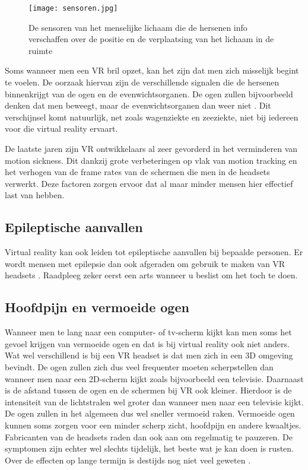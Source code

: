 \begin{figure}[h]
    \centering
    \texttt{[image: sensoren.jpg]}
    \caption{De sensoren van het menselijke lichaam die de hersenen info verschaffen over de positie en de verplaatsing van het lichaam in de ruimte \autocite{Dizzy2018}}
\end{figure}

Soms wanneer men een VR bril opzet, kan het zijn dat men zich misselijk begint te voelen. De oorzaak hiervan zijn de verschillende signalen die de hersenen binnenkrijgt van de ogen en de evenwichtsorganen.
De ogen zullen bijvoorbeeld denken dat men beweegt, maar de evenwichtsorganen dan weer niet \autocite{Kraft2017}. Dit verschijnsel komt natuurlijk, net zoals wagenziekte en zeeziekte, niet bij iedereen voor die virtual reality ervaart.

\pagebreak
De laatste jaren zijn VR ontwikkelaars al zeer gevorderd in het verminderen van motion sickness. Dit dankzij grote verbeteringen op vlak van motion tracking en het verhogen van de frame rates van de schermen die men in de headsets verwerkt. Deze factoren zorgen ervoor dat al maar minder mensen hier effectief last van hebben.

\subsection{Epileptische aanvallen}
Virtual reality kan ook leiden tot epileptische aanvallen bij bepaalde personen. Er wordt mensen met epilepsie dan ook afgeraden om gebruik te maken van VR headsets \autocite{Bolluyt2017}. Raadpleeg zeker eerst een arts wanneer u beslist om het toch te doen.

\subsection{Hoofdpijn en vermoeide ogen}
Wanneer men te lang naar een computer- of tv-scherm kijkt kan men soms het gevoel krijgen van vermoeide ogen en dat is bij virtual reality ook niet anders. Wat wel verschillend is bij een VR headset is dat men zich in een 3D omgeving bevindt. De ogen zullen zich dus veel frequenter moeten scherpstellen dan wanneer men naar een 2D-scherm kijkt zoals bijvoorbeeld een televisie. Daarnaast is de afstand tussen de ogen en de schermen bij VR ook kleiner. Hierdoor is de intensiteit van de lichtstralen wel groter dan wanneer men naar een televisie kijkt. De ogen zullen in het algemeen dus wel sneller vermoeid raken. Vermoeide ogen kunnen soms zorgen voor een minder scherp zicht, hoofdpijn en andere kwaaltjes. Fabricanten van de headsets raden dan ook aan om regelmatig te pauzeren. De symptomen zijn echter wel slechts tijdelijk, het beste wat je kan doen is rusten. Over de effecten op lange termijn is destijds nog niet veel geweten \autocite{Bolluyt2017}.


